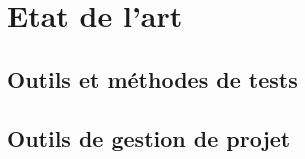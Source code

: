 \chapter{Etat de l'art}
\label{chap:EtatArt}
\section{Outils et méthodes de tests}
\label{sec:OutilsTests}
\section{Outils de gestion de projet}
\label{sec:OutilsGestion}
